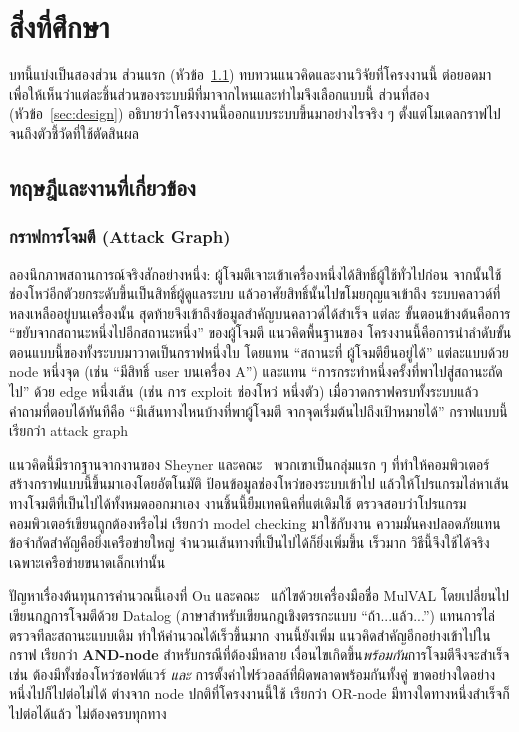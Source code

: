 \chapter{สิ่งที่ศึกษา}\label{ch:studied}

บทนี้แบ่งเป็นสองส่วน ส่วนแรก (หัวข้อ~\ref{sec:theory}) ทบทวนแนวคิดและงานวิจัยที่โครงงานนี้
ต่อยอดมา เพื่อให้เห็นว่าแต่ละชิ้นส่วนของระบบมีที่มาจากไหนและทำไมจึงเลือกแบบนี้
ส่วนที่สอง (หัวข้อ~\ref{sec:design}) อธิบายว่าโครงงานนี้ออกแบบระบบขึ้นมาอย่างไรจริง ๆ
ตั้งแต่โมเดลกราฟไปจนถึงตัวชี้วัดที่ใช้ตัดสินผล

\section{ทฤษฎีและงานที่เกี่ยวข้อง}\label{sec:theory}
\subsection{กราฟการโจมตี (Attack Graph)}\label{sec:theory-attackgraph}

ลองนึกภาพสถานการณ์จริงสักอย่างหนึ่ง: ผู้โจมตีเจาะเข้าเครื่องหนึ่งได้สิทธิ์ผู้ใช้ทั่วไปก่อน
จากนั้นใช้ช่องโหว่อีกตัวยกระดับขึ้นเป็นสิทธิ์ผู้ดูแลระบบ แล้วอาศัยสิทธิ์นั้นไปขโมยกุญแจเข้าถึง
ระบบคลาวด์ที่หลงเหลืออยู่บนเครื่องนั้น สุดท้ายจึงเข้าถึงข้อมูลสำคัญบนคลาวด์ได้สำเร็จ แต่ละ
ขั้นตอนข้างต้นคือการ ``ขยับจากสถานะหนึ่งไปอีกสถานะหนึ่ง'' ของผู้โจมตี แนวคิดพื้นฐานของ
โครงงานนี้คือการนำลำดับขั้นตอนแบบนี้ของทั้งระบบมาวาดเป็นกราฟหนึ่งใบ โดยแทน ``สถานะที่
ผู้โจมตียืนอยู่ได้'' แต่ละแบบด้วย node หนึ่งจุด (เช่น ``มีสิทธิ์ user บนเครื่อง A'') และแทน
``การกระทำหนึ่งครั้งที่พาไปสู่สถานะถัดไป'' ด้วย edge หนึ่งเส้น (เช่น การ exploit ช่องโหว่
หนึ่งตัว) เมื่อวาดกราฟครบทั้งระบบแล้ว คำถามที่ตอบได้ทันทีคือ ``มีเส้นทางไหนบ้างที่พาผู้โจมตี
จากจุดเริ่มต้นไปถึงเป้าหมายได้'' กราฟแบบนี้เรียกว่า attack graph

แนวคิดนี้มีรากฐานจากงานของ Sheyner และคณะ~\cite{sheyner2002} พวกเขาเป็นกลุ่มแรก ๆ
ที่ทำให้คอมพิวเตอร์สร้างกราฟแบบนี้ขึ้นมาเองโดยอัตโนมัติ ป้อนข้อมูลช่องโหว่ของระบบเข้าไป
แล้วให้โปรแกรมไล่หาเส้นทางโจมตีที่เป็นไปได้ทั้งหมดออกมาเอง งานชิ้นนี้ยืมเทคนิคที่แต่เดิมใช้
ตรวจสอบว่าโปรแกรมคอมพิวเตอร์เขียนถูกต้องหรือไม่ เรียกว่า model checking มาใช้กับงาน
ความมั่นคงปลอดภัยแทน ข้อจำกัดสำคัญคือยิ่งเครือข่ายใหญ่ จำนวนเส้นทางที่เป็นไปได้ก็ยิ่งเพิ่มขึ้น
เร็วมาก วิธีนี้จึงใช้ได้จริงเฉพาะเครือข่ายขนาดเล็กเท่านั้น

ปัญหาเรื่องต้นทุนการคำนวณนี้เองที่ Ou และคณะ~\cite{ou2005} แก้ไขด้วยเครื่องมือชื่อ
MulVAL โดยเปลี่ยนไปเขียนกฎการโจมตีด้วย Datalog (ภาษาสำหรับเขียนกฎเชิงตรรกะแบบ
``ถ้า...แล้ว...'') แทนการไล่ตรวจทีละสถานะแบบเดิม ทำให้คำนวณได้เร็วขึ้นมาก งานนี้ยังเพิ่ม
แนวคิดสำคัญอีกอย่างเข้าไปในกราฟ เรียกว่า \textbf{AND-node} สำหรับกรณีที่ต้องมีหลาย
เงื่อนไขเกิดขึ้น\emph{พร้อมกัน}การโจมตีจึงจะสำเร็จ เช่น ต้องมีทั้งช่องโหว่ซอฟต์แวร์ \emph{และ}
การตั้งค่าไฟร์วอลล์ที่ผิดพลาดพร้อมกันทั้งคู่ ขาดอย่างใดอย่างหนึ่งไปก็ไปต่อไม่ได้ ต่างจาก node
ปกติที่โครงงานนี้ใช้ เรียกว่า OR-node มีทางใดทางหนึ่งสำเร็จก็ไปต่อได้แล้ว ไม่ต้องครบทุกทาง


